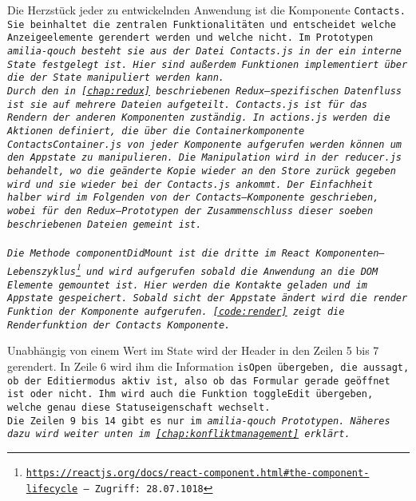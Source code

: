 Die Herzstück jeder zu entwickelnden Anwendung ist die Komponente \tt{Contacts}.
Sie beinhaltet die zentralen Funktionalitäten und entscheidet welche Anzeigeelemente gerendert werden und welche nicht.
Im Prototypen \it{amilia-qouch} besteht sie aus der Datei \tt{Contacts.js} in der ein interne State festgelegt ist.
Hier sind außerdem Funktionen implementiert über die der State manipuliert werden kann.\\
%
Durch den in \autoref{chap:redux} beschriebenen Redux--spezifischen Datenfluss ist sie auf mehrere Dateien aufgeteilt.
\tt{Contacts.js} ist für das Rendern der anderen Komponenten zuständig. 
In \tt{actions.js} werden die Aktionen definiert, die über die Containerkomponente \tt{ContactsContainer.js} von jeder Komponente aufgerufen werden können um den \gls{App}state zu manipulieren.
Die Manipulation wird in der \tt{reducer.js} behandelt, wo die geänderte Kopie wieder an den Store zurück gegeben wird und sie wieder bei der \tt{Contacts.js} ankommt.
Der Einfachheit halber wird im Folgenden von der Contacts--Komponente geschrieben, wobei für den Redux--Prototypen der Zusammenschluss dieser soeben beschriebenen Dateien gemeint ist.\\\\
%
% 
Die Methode \tt{componentDidMount} ist die dritte im React Komponenten--Lebenszyklus\footnote{ \url{https://reactjs.org/docs/react-component.html\#the-component-lifecycle} -- Zugriff: 28.07.1018} und wird aufgerufen sobald die Anwendung an die DOM Elemente gemountet ist.
Hier werden die Kontakte geladen und im \gls{App}state gespeichert.
Sobald sicht der \gls{App}state ändert wird die \tt{render} Funktion der Komponente aufgerufen. \autoref{code:render} zeigt die Renderfunktion der \tt{Contacts} Komponente.
%
\begin{center}
  
\end{center}
%
Unabhängig von einem Wert im State wird der Header in den Zeilen 5 bis 7 gerendert.
In Zeile 6 wird ihm die Information \tt{isOpen} übergeben, die aussagt, ob der Editiermodus aktiv ist, also ob das Formular gerade geöffnet ist oder nicht.
Ihm wird auch die Funktion \tt{toggleEdit} übergeben, welche genau diese Statuseigenschaft wechselt.\\
%
Die Zeilen 9 bis 14 gibt es nur im \it{amilia-qouch} Prototypen. Näheres dazu wird weiter unten im \autoref{chap:konfliktmanagement} erklärt.\\
